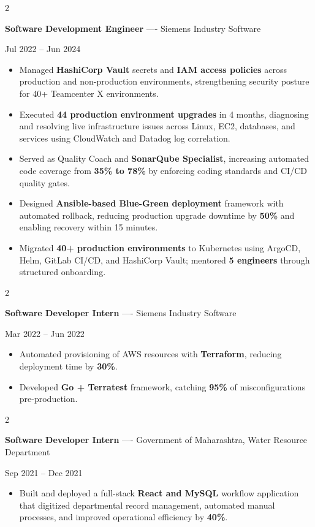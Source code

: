 \documentclass[10pt, letterpaper]{article}
\newenvironment{highlights}{
    \begin{itemize}[
        topsep=0.10 cm,
        parsep=0.06 cm,
        partopsep=0pt,
        itemsep=0.06 cm,
        leftmargin=12pt
    ]
}{
    \end{itemize}
}
\newenvironment{twocolentry}[2][]{
    \onecolentry
    \def\secondColumn{#2}
    \setcolumnwidth{\fill, 4.5 cm}
    \begin{paracol}{2}
}{
    \switchcolumn \raggedleft \secondColumn
    \end{paracol}
    \endonecolentry
}
\begin{document}
\vspace{0.15 cm}

\begin{twocolentry}{Jul 2022 -- Jun 2024}
\textbf{Software Development Engineer} ---- Siemens Industry Software
\end{twocolentry}
\begin{highlights}
  \item Managed \textbf{HashiCorp Vault} secrets and \textbf{IAM access policies} across production and non-production environments, strengthening security posture for 40+ Teamcenter X environments.
  \item Executed \textbf{44 production environment upgrades} in 4 months, diagnosing and resolving live infrastructure issues across Linux, EC2, databases, and services using CloudWatch and Datadog log correlation.
  \item Served as Quality Coach and \textbf{SonarQube Specialist}, increasing automated code coverage from \textbf{35\% to 78\%} by enforcing coding standards and CI/CD quality gates.
  \item Designed \textbf{Ansible-based Blue-Green deployment} framework with automated rollback, reducing production upgrade downtime by \textbf{50\%} and enabling recovery within 15 minutes.
  \item Migrated \textbf{40+ production environments} to Kubernetes using ArgoCD, Helm, GitLab CI/CD, and HashiCorp Vault; mentored \textbf{5 engineers} through structured onboarding.
\end{highlights}

\vspace{0.15 cm}

\begin{twocolentry}{Mar 2022 -- Jun 2022}
\textbf{Software Developer Intern} ---- Siemens Industry Software
\end{twocolentry}
\begin{highlights}
  \item Automated provisioning of AWS resources with \textbf{Terraform}, reducing deployment time by \textbf{30\%}.
  \item Developed \textbf{Go + Terratest} framework, catching \textbf{95\%} of misconfigurations pre-production.
\end{highlights}

\vspace{0.15 cm}

\begin{twocolentry}{Sep 2021 -- Dec 2021}
\textbf{Software Developer Intern} ---- Government of Maharashtra, Water Resource Department
\end{twocolentry}
\begin{highlights}
  \item Built and deployed a full-stack \textbf{React and MySQL} workflow application that digitized departmental record management, automated manual processes, and improved operational efficiency by \textbf{40\%}.
\end{highlights}
\end{document}
